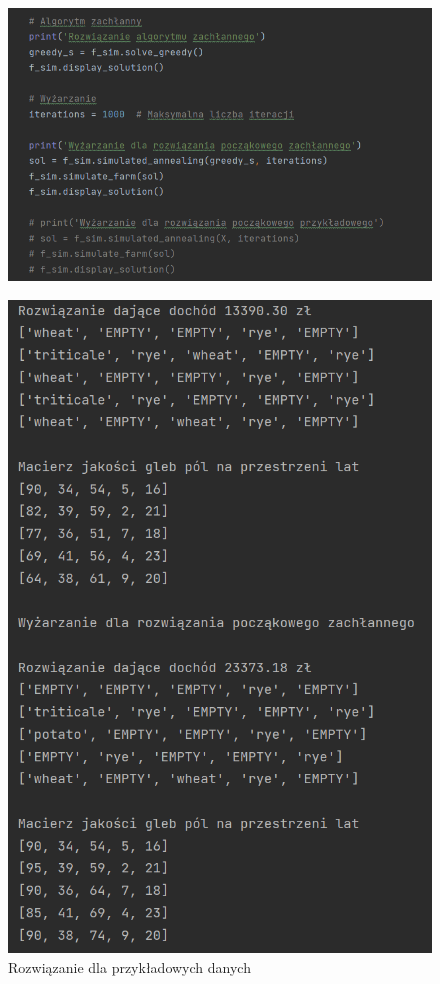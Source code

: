 \documentclass[12pt,a4paper]{article}
\begin{document}
\begin{figure}[H]
	\centering
	\includegraphics[width=1\linewidth]{screens/main2}
	\caption{}
	\label{fig:main2}
\end{figure}


\begin{figure}[H]
	\centering
	\includegraphics[width=1\linewidth]{screens/przykłądowe_rozw}
	\caption{Rozwiązanie dla przykładowych danych}
	\label{fig:przykadowerozw}
\end{figure}
\end{document}
